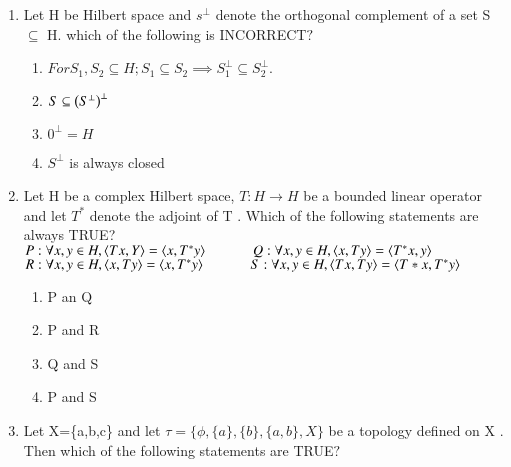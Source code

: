 \documentclass[journal]{IEEEtran}
\begin{document}
\begin{enumerate}[start=1]
$S: $ If $f:R\rightarrow X$ is continuous, where R is given the usual topology and $\brak{X,T}$ is a Hausdorff $\brak{T_2}$ space, then $f$ is one-one function.\\
which of the above statements are correct$?$
\begin{multicols}{4}
    \begin{enumerate}
        \item P and R
        \item P and S
        \item R and S
        \item Q and S
    \end{enumerate}
\end{multicols}
\item Let H be Hilbert space and $s^\perp$ denote the orthogonal complement of a set S $\subseteq$ H. which of the following is INCORRECT$?$
    \begin{enumerate}
        \item $For S_1,S_2\subseteq H; S_1\subseteq S_2\implies S_1^\perp\subseteq S_2^\perp. $        \item $S \subseteq \left(S^\perp\right)^\perp$
        \item ${0}^\perp = H$
        \item $S^\perp$ is always closed
    \end{enumerate}
\item Let H be a complex Hilbert space, $T:H\rightarrow H$ be a bounded linear operator and let $T^{*}$ denote the adjoint of T . Which of the following statements are always TRUE?\\
$P: \forall x,y \in H,\langle Tx,Y \rangle = \langle x,T^*y \rangle   \hspace{1.2cm}  Q: \forall x,y \in H,\langle x,Ty \rangle = \langle T^*x,y \rangle$  \\
$R: \forall x,y \in H,\langle x,Ty \rangle = \langle x,T^*y \rangle   \hspace{1.2cm}  S: \forall x,y \in H,\langle Tx,Ty \rangle = \langle T*x,T^*y \rangle$
\begin{multicols}{4}
    \begin{enumerate}
        \item P an Q
        \item P and R
        \item Q and S
        \item P and S
    \end{enumerate}
\end{multicols}
\item  Let X=\{a,b,c\} and let $\tau=\{\phi,\{a\},\{b\},\{a,b\},X\}$ be a topology defined on X . Then which of the following statements are TRUE$?$\\

\end{enumerate}
\end{document}
